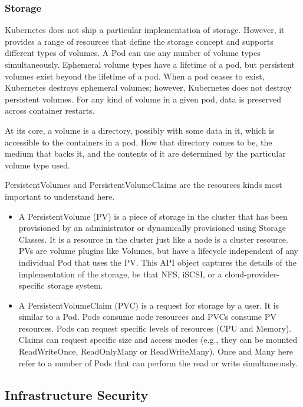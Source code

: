 \subsubsection*{Storage}

Kubernetes does not ship a particular implementation of storage. However, it provides a range of resources that define the storage concept and supports different types of volumes. A Pod can use any number of volume types simultaneously. Ephemeral volume types have a lifetime of a pod, but persistent volumes exist beyond the lifetime of a pod. When a pod ceases to exist, Kubernetes destroys ephemeral volumes; however, Kubernetes does not destroy persistent volumes. For any kind of volume in a given pod, data is preserved across container restarts.

At its core, a volume is a directory, possibly with some data in it, which is accessible to the containers in a pod. How that directory comes to be, the medium that backs it, and the contents of it are determined by the particular volume type used.

PersistentVolumes and PersistentVolumeClaims are the resources kinds most important to understand here.
\begin{itemize}
\item A PersistentVolume (PV) is a piece of storage in the cluster that has been provisioned by an administrator or dynamically provisioned using Storage Classes. It is a resource in the cluster just like a node is a cluster resource. PVs are volume plugins like Volumes, but have a lifecycle independent of any individual Pod that uses the PV. This API object captures the details of the implementation of the storage, be that NFS, iSCSI, or a cloud-provider-specific storage system.
\item A PersistentVolumeClaim (PVC) is a request for storage by a user. It is similar to a Pod. Pods consume node resources and PVCs consume PV resources. Pods can request specific levels of resources (CPU and Memory). Claims can request specific size and access modes (e.g., they can be mounted ReadWriteOnce, ReadOnlyMany or ReadWriteMany). Once and Many here refer to a number of Pods that can perform the read or write simultaneously.
\end{itemize}

\subsection{Infrastructure Security}

